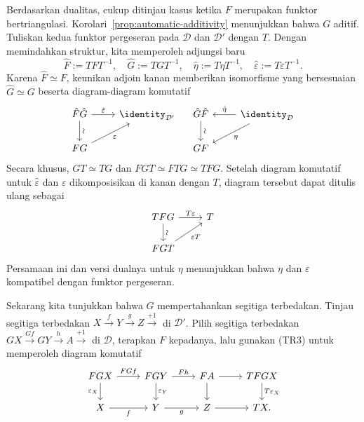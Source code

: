\begin{bukti}
	Berdasarkan dualitas, cukup ditinjau kasus ketika $F$ merupakan funktor
	bertriangulasi. Korolari~\ref{prop:automatic-additivity} menunjukkan bahwa
	$G$ aditif. Tuliskan kedua funktor pergeseran pada $\mathcal{D}$ dan
	$\mathcal{D}'$ dengan $T$. Dengan memindahkan struktur, kita memperoleh
	adjungsi baru
	\[ \hat{F} := T F T^{-1}, \quad \hat{G} := T G T^{-1}, \quad \hat{\eta} := T\eta T^{-1}, \quad \hat{\varepsilon} := T \varepsilon T^{-1}. \]
	Karena $\hat{F} \simeq F$, keunikan adjoin kanan
	\cite[Proposisi~2.6.10]{Li1} memberikan isomorfisme yang bersesuaian
	$\hat{G} \simeq G$ beserta diagram-diagram komutatif
	\[\begin{tikzcd}
		\hat{F} \hat{G} \arrow[r, "\hat{\varepsilon}"] \arrow[d, "\sim" sloped] & \identity_{\mathcal{D}'} \\
		FG \arrow[ru, "{\varepsilon}"'] &
	\end{tikzcd} \quad \begin{tikzcd}
		\hat{G} \hat{F} \arrow[d, "\sim" sloped] & \identity_{\mathcal{D}} \arrow[l, "\hat{\eta}"'] \arrow[ld, "\eta"] \\
		GF &
	\end{tikzcd}\]
	Secara khusus, $GT \simeq TG$ dan $FGT \simeq FTG \simeq TFG$.
	Setelah diagram komutatif untuk $\hat{\varepsilon}$ dan $\varepsilon$
	dikomposisikan di kanan dengan $T$, diagram tersebut dapat ditulis ulang
	sebagai
	\begin{equation}\label{eqn:adjoint-triangulated-aux0}\begin{tikzcd}
		TFG \arrow[r, "{T\varepsilon}"] \arrow[d, "\sim" sloped] & T \\
		FGT \arrow[ru, "\varepsilon T"'] &
	\end{tikzcd}\end{equation}
	Persamaan ini dan versi dualnya untuk $\eta$ menunjukkan bahwa $\eta$ dan
	$\varepsilon$ kompatibel dengan funktor pergeseran.

	Sekarang kita tunjukkan bahwa $G$ mempertahankan segitiga terbedakan. Tinjau
	segitiga terbedakan $X \xrightarrow{f} Y \xrightarrow{g} Z
	\xrightarrow{+1}$ di $\mathcal{D}'$. Pilih segitiga terbedakan
	$GX \xrightarrow{Gf} GY \xrightarrow{h} A \xrightarrow{+1}$ di
	$\mathcal{D}$, terapkan $F$ kepadanya, lalu gunakan (TR3) untuk
	memperoleh diagram komutatif
	\begin{equation*}\begin{tikzcd}
		FG X \arrow[r, "FGf"] \arrow[d, "\varepsilon_X"'] & FG Y \arrow[d, "\varepsilon_Y"] \arrow[r, "Fh"] & FA \arrow[r] \arrow[d] & TFGX \arrow[d, "T\varepsilon_X"] \\
		X \arrow[r, "f"'] & Y \arrow[r, "g"'] & Z \arrow[r] & TX .
	\end{tikzcd}\end{equation*}


\end{bukti}
